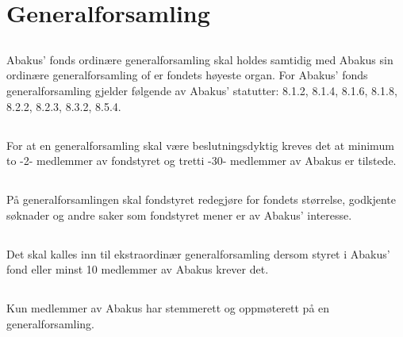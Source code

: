 \section{Generalforsamling}

\subsection{}
Abakus’ fonds ordinære generalforsamling skal holdes samtidig med Abakus sin
ordinære generalforsamling of er fondets høyeste organ. For Abakus’ fonds
generalforsamling gjelder følgende av Abakus’ statutter: 8.1.2, 8.1.4, 8.1.6,
8.1.8, 8.2.2, 8.2.3, 8.3.2, 8.5.4.

\subsection{}
For at en generalforsamling skal være beslutningsdyktig kreves det at minimum
to -2- medlemmer av fondstyret og tretti -30- medlemmer av Abakus er tilstede. 

\subsection{}
På generalforsamlingen skal fondstyret redegjøre for fondets størrelse,
godkjente søknader og andre saker som fondstyret mener er av Abakus’
interesse. 

\subsection{}
Det skal kalles inn til ekstraordinær generalforsamling dersom styret i
Abakus’ fond eller minst 10 medlemmer av Abakus krever det.

\subsection{}
Kun medlemmer av Abakus har stemmerett og oppmøterett på en generalforsamling.
